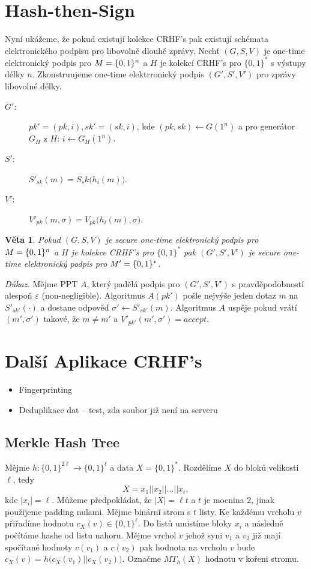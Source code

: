 \documentclass{article}
\newtheorem{theorem}{Věta}
\begin{document}
\section{Hash-then-Sign}
Nyní ukážeme, že pokud existují kolekce CRHF's pak existují schémata elektronického podpisu pro libovolně dlouhé zprávy.
Nechť $(G,S,V)$ je one-time elektronický podpis pro ${\sc M} = \{0,1\}^n$ a $H$ je kolekcí CRHF's pro $\{0,1\}^*$ s výstupy délky $n$.
Zkonstruujeme one-time elektrronický podpis $(G',S',V')$ pro zprávy libovolné délky.
\begin{description}
\item[$G'$:] $pk'=(pk,i), sk'=(sk,i)$, kde $(pk,sk) \leftarrow G(1^n)$ a pro generátor $G_H$ z $H$: $i \leftarrow G_H(1^n)$.
\item[$S'$:] $S'_{sk}(m) = S_sk\bigl(h_i(m)\bigr)$.
\item[$V'$:] $V'_{pk}(m,\sigma) = V_{pk}\bigl(h_i(m),\sigma\bigr)$.
\end{description}

\begin{theorem}
Pokud $(G,S,V)$ je secure one-time elektronický podpis pro ${\sc M} = \{0,1\}^n$ a $H$ je kolekce CRHF's pro $\{0,1\}^*$ pak $(G',S',V')$ je secure one-time elektronický podpis pro ${\sc M}' = \{0,1\}^*$.
\end{theorem}
\noindent\textit{Důkaz.}
Mějme PPT $A$, který padělá podpis pro $(G',S',V')$ s pravděpodobností alespoň $\varepsilon$ (non-negligible).
Algoritmus $A(pk')$ pošle nejvýše jeden dotaz $m$ na $S'_{sk'}(\cdot)$ a dostane odpověď $\sigma' \leftarrow S'_{sk'}(m)$.
Algoritmus $A$ uspěje pokud vrátí $(m',\sigma')$ takové, že $m \neq m'$ a $V'_{pk'}(m',\sigma') = \textit{accept}$.

\section{Další Aplikace CRHF's}
\begin{itemize}
\item Fingerprinting
\item Deduplikace dat -- test, zda soubor již není na serveru
\end{itemize}
\subsection{Merkle Hash Tree}
Mějme $h: \{0,1\}^{2\ell} \to \{0,1\}^\ell$ a data $X = \{0,1\}^*$. 
Rozdělíme $X$ do bloků velikosti $\ell$, tedy
\[
X = x_1 || x_2 || \dots || x_t,
\]
kde $|x_i| = \ell$.
Můžeme předpokládat, že $|X| = \ell t$ a $t$ je mocnina 2, jinak použijeme padding nulami.
Mějme binární strom s $t$ listy.
Ke každému vrcholu $v$ přiřadíme hodnotu $c_X(v) \in \{0,1\}^\ell$.
Do listů umistíme bloky $x_i$ a následně počítáme hashe od listu nahoru.
Mějme vrchol $v$ jehož syni $v_1$ a $v_2$ již mají spočítané hodnoty $c(v_1)$ a $c(v_2)$ pak hodnota na vrcholu $v$ bude $c_X(v) = h\bigl(c_X(v_1) || c_X(v_2)\bigr)$. 
Označme $MT_h(X)$ hodnotu v kořeni stromu.
\end{document}
